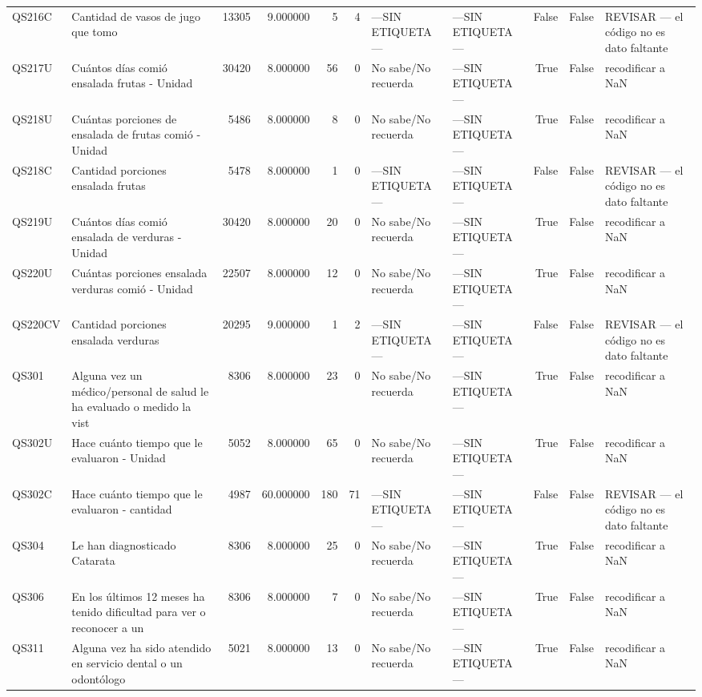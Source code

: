 \begin{longtable}{llrrrrllrrl}
QS216C & Cantidad de vasos de jugo que tomo & 13305 & 9.000000 & 5 & 4 & —SIN ETIQUETA— & —SIN ETIQUETA— & False & False & REVISAR — el código no es dato faltante \\
QS217U & Cuántos días comió ensalada frutas - Unidad & 30420 & 8.000000 & 56 & 0 & No sabe/No recuerda & —SIN ETIQUETA— & True & False & recodificar a NaN \\
QS218U & Cuántas porciones de ensalada de frutas comió - Unidad & 5486 & 8.000000 & 8 & 0 & No sabe/No recuerda & —SIN ETIQUETA— & True & False & recodificar a NaN \\
QS218C & Cantidad porciones ensalada frutas & 5478 & 8.000000 & 1 & 0 & —SIN ETIQUETA— & —SIN ETIQUETA— & False & False & REVISAR — el código no es dato faltante \\
QS219U & Cuántos días comió ensalada de verduras - Unidad & 30420 & 8.000000 & 20 & 0 & No sabe/No recuerda & —SIN ETIQUETA— & True & False & recodificar a NaN \\
QS220U & Cuántas porciones ensalada verduras comió - Unidad & 22507 & 8.000000 & 12 & 0 & No sabe/No recuerda & —SIN ETIQUETA— & True & False & recodificar a NaN \\
QS220CV & Cantidad porciones ensalada verduras & 20295 & 9.000000 & 1 & 2 & —SIN ETIQUETA— & —SIN ETIQUETA— & False & False & REVISAR — el código no es dato faltante \\
QS301 & Alguna vez un médico/personal de salud le ha evaluado o medido la vist & 8306 & 8.000000 & 23 & 0 & No sabe/No recuerda & —SIN ETIQUETA— & True & False & recodificar a NaN \\
QS302U & Hace cuánto tiempo que le evaluaron - Unidad & 5052 & 8.000000 & 65 & 0 & No sabe/No recuerda & —SIN ETIQUETA— & True & False & recodificar a NaN \\
QS302C & Hace cuánto tiempo que le evaluaron - cantidad & 4987 & 60.000000 & 180 & 71 & —SIN ETIQUETA— & —SIN ETIQUETA— & False & False & REVISAR — el código no es dato faltante \\
QS304 & Le han diagnosticado Catarata & 8306 & 8.000000 & 25 & 0 & No sabe/No recuerda & —SIN ETIQUETA— & True & False & recodificar a NaN \\
QS306 & En los últimos 12 meses ha tenido dificultad para ver o reconocer a un & 8306 & 8.000000 & 7 & 0 & No sabe/No recuerda & —SIN ETIQUETA— & True & False & recodificar a NaN \\
QS311 & Alguna vez ha sido atendido en servicio dental o un odontólogo & 5021 & 8.000000 & 13 & 0 & No sabe/No recuerda & —SIN ETIQUETA— & True & False & recodificar a NaN \\

\end{longtable}
